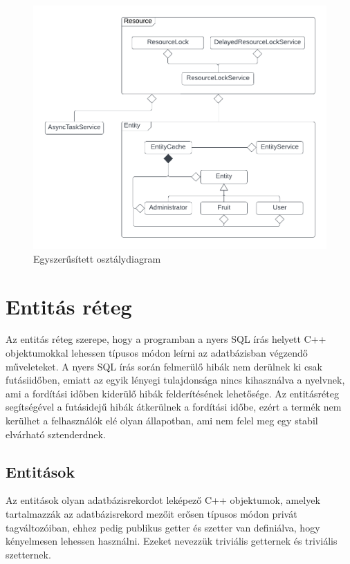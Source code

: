 \begin{figure}[H]
	\centering
	\includegraphics[width=1\textwidth]{images/classdiagram.png}
	\caption{Egyszerűsített osztálydiagram}
	\label{fig:main_window}
\end{figure}

\section{Entitás réteg}

Az entitás réteg szerepe, hogy a programban a nyers SQL írás helyett C++ objektumokkal lehessen típusos módon leírni az adatbázisban végzendő műveleteket. A nyers SQL írás során felmerülő hibák nem derülnek ki csak futásiidőben, emiatt az egyik lényegi tulajdonsága nincs kihasználva a nyelvnek, ami a fordítási időben kiderülő hibák felderítésének lehetősége. Az entitásréteg segítségével a futásidejű hibák átkerülnek a fordítási időbe, ezért a termék nem kerülhet a felhasználók elé olyan állapotban, ami nem felel meg egy stabil elvárható sztenderdnek.

\subsection{Entitások}

Az entitások olyan adatbázisrekordot leképező C++ objektumok, amelyek tartalmazzák az adatbázisrekord mezőit erősen típusos módon privát tagváltozóiban, ehhez pedig publikus getter és szetter van definiálva, hogy kényelmesen lehessen használni. Ezeket nevezzük triviális getternek és triviális szetternek.

